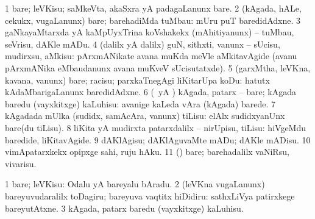 {{{{{{\begin{center}
{{\noindent
\gl{\sakirx}
\bmng
\bnum
\num{1} bare; leVKisu; saMkeVta, akaSxra yA padagaLanunx bare. 
\num{2} (kAgada, hALe, cekukx, \mo vugaLanunx) bare; barehadiMda tuMbau:  mUru puT baredidAdxne. 
\num{3} gaNkayaMtarxda yA kaMpUyxTrina koVshakekx (mAhitiyanunx) -- tuMbau, seVrisu, dAKle mADu. 
\num{4} (\kaparx dalilx yA \BUkaq dalilx) guN, sithxti, \mo vanunx -- sUcisu, mudirxsu, aMkisu:  pArxmANikate avana muKda meVle aMkitavAgide (avanu pArxmANika eMbaudanunx avana muKveV sUcisutatxde). 
\num{5} (garxMtha, leVKna, kavana, \mo vanunx) bare; racisu; parxkaTnegAgi liKitarUpa koDu:  hatutx kAdaMbarigaLanunx baredidAdxne. 
\num{6} (\ame\ yA \AmA) kAgada, patarx -- bare; kAgada baredu (vayxkitxge) kaLuhisu:  avanige kaLeda vAra (kAgada) barede. 
\num{7} kAgadada mUlka (sudidx, samAcAra, \mo vanunx) tiLisu:  elAlx sudidxyanUnx bare(du tiLisu). 
\num{8} liKita yA mudirxta patarxdalilx -- nirUpisu, tiLisu:  hiVgeMdu baredide, liKitavAgide. 
\num{9} dAKlAgisu; dAKlAguvaMte mADu; dAKle mADisu. 
\num{10} vimApatarxkekx opipxge sahi, ruju hAku. 
\num{11} (\pArxparx) bare; barehadalilx vaNiRsu, vivarisu. 
\enum
\emng

\noindent
\gl{\akirx}
\expl{}
\bmng
\bnum
\num{1} bare; leVKisu:  Odalu yA bareyalu bAradu. 
\num{2} (leVKna \mo vugaLanunx) bareyuvudaralilx toDagiru; bareyuva vaqtitx hiDidiru:  sathxLiVya patirxkege bareyutAtxne. 
\num{3} kAgada, patarx baredu (vayxkitxge) kaLuhisu. 
\enum
\emng

}}
\end{center}}}}}}}
